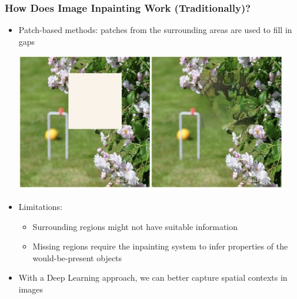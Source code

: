 \documentclass{beamer}
\begin{document}
\begin{frame}
	\frametitle{How Does Image Inpainting Work (Traditionally)?}
	\begin{itemize}
		\item Patch-based methods: patches from the surrounding areas are used to fill in gaps
		
		\begin{center}
			\includegraphics[scale=0.8]{patch.png}
		\end{center}
		
		\item Limitations:
		\begin{itemize}
			\item  Surrounding regions might not have suitable information
			\item Missing regions require the inpainting system to infer properties of the would-be-present objects
		\end{itemize}
		\item With a Deep Learning approach, we can better capture spatial contexts in  images
	\end{itemize}
\end{frame}
\end{document}
